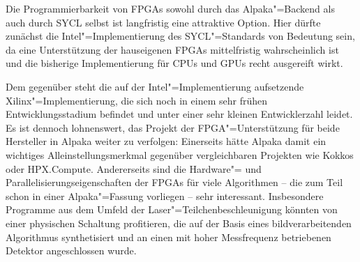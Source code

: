 Die Programmierbarkeit von FPGAs sowohl durch das Alpaka"=Backend als auch durch
SYCL selbst ist langfristig eine attraktive Option. Hier dürfte zunächst die
Intel"=Implementierung des SYCL"=Standards von Bedeutung sein, da eine
Unterstützung der hauseigenen FPGAs mittelfristig wahrscheinlich ist und die
bisherige Implementierung für CPUs und GPUs recht ausgereift wirkt.

Dem gegenüber steht die auf der Intel"=Implementierung aufsetzende
Xilinx"=Implementierung, die sich noch in einem sehr frühen Entwicklungsstadium
befindet und unter einer sehr kleinen Entwicklerzahl leidet. Es ist dennoch
lohnenswert, das Projekt der FPGA"=Unterstützung für beide Hersteller in Alpaka
weiter zu verfolgen: Einerseits hätte Alpaka damit ein wichtiges
Alleinstellungsmerkmal gegenüber vergleichbaren Projekten wie Kokkos oder
HPX.Compute. Andererseits sind die Hardware"= und Parallelisierungseigenschaften
der FPGAs für viele Algorithmen -- die zum Teil schon in einer Alpaka"=Fassung
vorliegen -- sehr interessant. Insbesondere Programme aus dem Umfeld der
Laser"=Teilchenbeschleunigung könnten von einer physischen Schaltung
profitieren, die auf der Basis eines bildverarbeitenden Algorithmus 
synthetisiert und an einen mit hoher Messfrequenz betriebenen Detektor
angeschlossen wurde.
